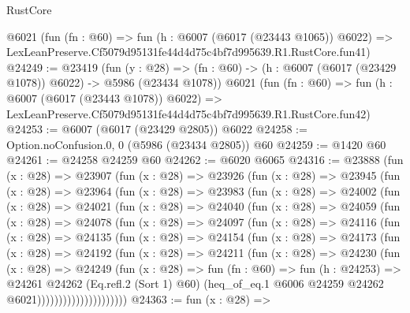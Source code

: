 \begin{lexlean}{RustCore}
\begin{coremodule}
    @6021
    (fun (fn : @60) =>
    fun (h : @6007 (@6017 (@23443 @1065)) @6022) =>
    LexLeanPreserve.Cf5079d95131fe44d4d75c4bf7d995639.R1.RustCore.fun41)
@24249 := @23419
    (fun (y : @28) =>
    (fn : @60) -> (h : @6007 (@6017 (@23429 @1078)) @6022) -> @5986 (@23434 @1078))
    @6021
    (fun (fn : @60) =>
    fun (h : @6007 (@6017 (@23443 @1078)) @6022) =>
    LexLeanPreserve.Cf5079d95131fe44d4d75c4bf7d995639.R1.RustCore.fun42)
@24253 := @6007 (@6017 (@23429 @2805)) @6022
@24258 := Option.noConfusion.{0, 0} (@5986 (@23434 @2805)) @60
@24259 := @1420 @60
@24261 := @24258 @24259 @60
@24262 := @6020 @6065
@24316 := @23888
    (fun (x : @28) =>
    @23907
      (fun (x : @28) =>
      @23926
        (fun (x : @28) =>
        @23945
          (fun (x : @28) =>
          @23964
            (fun (x : @28) =>
            @23983
              (fun (x : @28) =>
              @24002
                (fun (x : @28) =>
                @24021
                  (fun (x : @28) =>
                  @24040
                    (fun (x : @28) =>
                    @24059
                      (fun (x : @28) =>
                      @24078
                        (fun (x : @28) =>
                        @24097
                          (fun (x : @28) =>
                          @24116
                            (fun (x : @28) =>
                            @24135
                              (fun (x : @28) =>
                              @24154
                                (fun (x : @28) =>
                                @24173
                                  (fun (x : @28) =>
                                  @24192
                                    (fun (x : @28) =>
                                    @24211
                                      (fun (x : @28) =>
                                      @24230
                                        (fun (x : @28) =>
                                        @24249
                                          (fun (x : @28) =>
                                          fun (fn : @60) =>
                                          fun (h : @24253) =>
                                          @24261
                                            @24262
                                            (Eq.refl.{2} (Sort 1) @60)
                                            (heq_of_eq.{1}
                                              @6006
                                              @24259
                                              @24262
                                              @6021)))))))))))))))))))))
@24363 := fun (x : @28) =>

\end{coremodule}
\end{lexlean}

